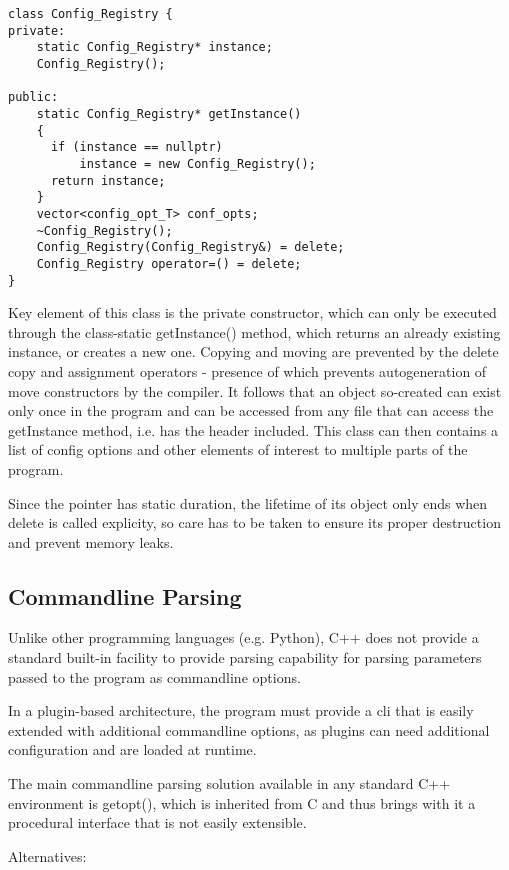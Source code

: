 \begin{lstlisting}
class Config_Registry {
private:
    static Config_Registry* instance; 
    Config_Registry();

public:
    static Config_Registry* getInstance()
    {
      if (instance == nullptr)
          instance = new Config_Registry();
      return instance;
    }
    vector<config_opt_T> conf_opts;
    ~Config_Registry();
    Config_Registry(Config_Registry&) = delete;
    Config_Registry operator=() = delete;
}

\end{lstlisting}
Key element of this class is the private constructor, which can only be executed through the class-static getInstance() method, which returns an already existing instance, or creates a new one.
Copying and moving are prevented by the delete copy and assignment operators - presence of which prevents autogeneration of move constructors by the compiler.
It follows that an object so-created can exist only once in the program and can be accessed from any file that can access the getInstance method, i.e. has the header included. 
This class can then contains a list of config options and other elements of interest to multiple parts of the program. 

Since the pointer has static duration, the lifetime of its object only ends when delete is called explicity, so care has to be taken to ensure its proper destruction and prevent memory leaks.

\subsection{Commandline Parsing}
Unlike other programming languages (e.g. Python), C++ does not provide a standard built-in facility to provide parsing capability for parsing parameters passed to the program as commandline options.

In a plugin-based architecture, the program must provide a \gls{cli} that is easily extended with additional commandline options, as plugins can need additional configuration and are loaded at runtime.

The main commandline parsing solution available in any standard C++ environment is getopt(), which is inherited from C and thus brings with it a procedural interface that is not easily extensible.

Alternatives:


